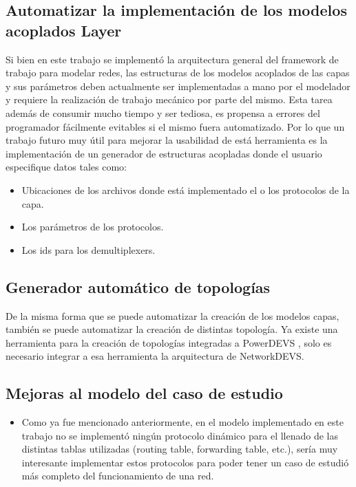 \documentclass[10pt,a4paper]{article}
\begin{document}
\subsection{Automatizar la implementación de los modelos acoplados Layer}
Si bien en este trabajo se implementó la arquitectura general del framework de trabajo para modelar redes, las estructuras de los modelos acoplados de las capas y sus parámetros deben actualmente ser implementadas a mano por el modelador y requiere la realización de trabajo mecánico por parte del mismo. Esta tarea además de consumir mucho tiempo y ser tediosa, es propensa a errores del programador fácilmente evitables si el mismo fuera automatizado. Por lo que un trabajo futuro muy útil para mejorar la usabilidad de está herramienta es la implementación de un generador de estructuras acopladas donde el usuario especifique datos tales como:

\begin{itemize}
\item Ubicaciones de los archivos donde está implementado el o los protocolos de la capa.
\item Los parámetros de los protocolos.
\item Los ids para los demultiplexers.
\end{itemize}

\subsection{Generador automático de topologías}
De la misma forma que se puede automatizar la creación de los modelos capas, también se puede automatizar la creación de distintas topología. Ya existe una herramienta para la creación de topologías integradas a PowerDEVS \cite{laurito2017topogen}, solo es necesario integrar a esa herramienta la arquitectura de NetworkDEVS.

\subsection{Mejoras al modelo del caso de estudio}
\begin{itemize}
\item Como ya fue mencionado anteriormente, en el modelo implementado en este trabajo no se implementó ningún protocolo dinámico para el llenado de las distintas tablas utilizadas (routing table, forwarding table, etc.), sería muy interesante implementar estos protocolos para poder tener un caso de estudió más completo del funcionamiento de una red.
\end{itemize}
\end{document}
